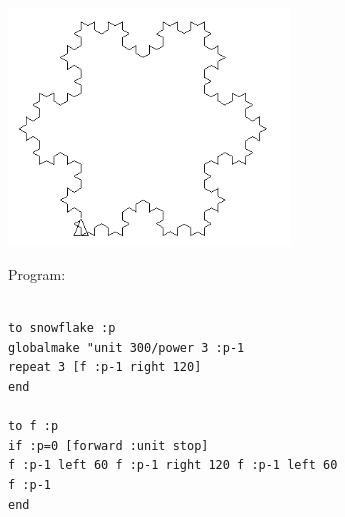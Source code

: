 \begin{center}
\begin{minipage}{7.5cm}
\end{minipage}
\begin{minipage}{7.5cm}
 \includegraphics[width=7.5cm]{pics/linden-flocon4.png}
\end{minipage}
\end{center}
\noindent \xlogo Program:
\begin{verbatim}
 
to snowflake :p
globalmake "unit 300/power 3 :p-1
repeat 3 [f :p-1 right 120]  
end

to f :p
if :p=0 [forward :unit stop]
f :p-1 left 60 f :p-1 right 120 f :p-1 left 60
f :p-1 
end

\end{verbatim}
